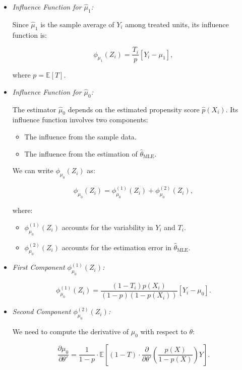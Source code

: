 \documentclass{article}
\begin{document}
\begin{itemize}
    \item \textit{Influence Function for \( \hat{\mu}_1 \):}

    Since \( \hat{\mu}_1 \) is the sample average of \( Y_i \) among treated units, its influence function is:

    \[
    \phi_{\mu_1}(Z_i) = \frac{T_i}{p} [Y_i - \mu_1],
    \]

    where \( p = \mathbb{E}[T] \).

    \item \textit{Influence Function for \( \hat{\mu}_0 \):}

    The estimator \( \hat{\mu}_0 \) depends on the estimated propensity score \( \hat{p}(X_i) \). Its influence function involves two components:
    \begin{itemize}
        \item The influence from the sample data.
        \item The influence from the estimation of \( \hat{\theta}_{\text{MLE}} \).
    \end{itemize}

    We can write \( \phi_{\mu_0}(Z_i) \) as:

    \[
    \phi_{\mu_0}(Z_i) = \phi_{\mu_0}^{(1)}(Z_i) + \phi_{\mu_0}^{(2)}(Z_i),
    \]

    where:
    \begin{itemize}
        \item \( \phi_{\mu_0}^{(1)}(Z_i) \) accounts for the variability in \( Y_i \) and \( T_i \).
        \item \( \phi_{\mu_0}^{(2)}(Z_i) \) accounts for the estimation error in \( \hat{\theta}_{\text{MLE}} \).
    \end{itemize}

    \item \textit{First Component \( \phi_{\mu_0}^{(1)}(Z_i) \):}

    \[
    \phi_{\mu_0}^{(1)}(Z_i) = \frac{(1 - T_i) p(X_i)}{(1 - p)(1 - p(X_i))} [Y_i - \mu_0].
    \]

    \item \textit{Second Component \( \phi_{\mu_0}^{(2)}(Z_i) \):}

    We need to compute the derivative of \( \mu_0 \) with respect to \( \theta \):

    \[
    \frac{\partial \mu_0}{\partial \theta'} = \frac{1}{1 - p} \cdot \mathbb{E}\left[ (1 - T) \cdot \frac{\partial}{\partial \theta'}\left( \frac{p(X)}{1 - p(X)} \right) Y \right].
    \]


\end{itemize}
\end{document}
